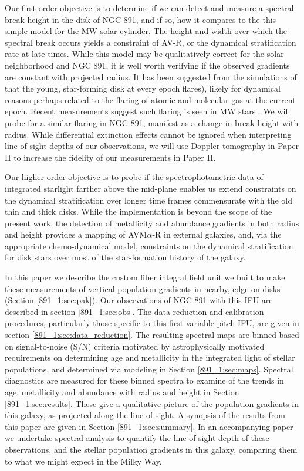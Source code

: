 Our first-order objective is to determine if we can detect and measure
a spectral break height in the disk of NGC 891, and if so, how it
compares to the this simple model for the MW solar cylinder. The
height and width over which the spectral break occurs yields a
constraint of AV-R, or the dynamical stratification rate at late
times. While this model may be qualitatively correct for the solar
neighborhood and NGC 891, it is well worth verifying if the observed
gradients are constant with projected radius.  It has been suggested
from the simulations of \citet{Martig14a} that the young, star-forming
disk at every epoch flares), likely for dynamical reasons perhaps
related to the flaring of atomic and molecular gas at the current
epoch. Recent measurements suggest such flaring is seen in MW stars
\citep{Ness16}. We will probe for a similar flaring in NGC 891,
manifest as a change in break height with radius.  While differential
extinction effects cannot be ignored when interpreting line-of-sight
depths of our observations, we will use Doppler tomography in Paper II
\citep[see for example,][]{Kregel05} to increase the fidelity of
our measurements in Paper II.

Our higher-order objective is to probe if the spectrophotometric data
of integrated starlight farther above the mid-plane enables us extend
constraints on the dynamical stratification over longer time frames
commensurate with the old thin and thick disks.  While the
implementation is beyond the scope of the present work, the detection
of metallicity and abundance gradients in both radius and height
provides a mapping of AVM$\alpha$-R in external galaxies, and, via the
appropriate chemo-dynamical model, constraints on the dynamical
stratification for disk stars over most of the star-formation history
of the galaxy.

In this paper we describe the custom fiber integral field unit we
built to make these measurements of vertical population gradients in
nearby, edge-on disks (Section \ref{891_1:sec:pak}).  Our observations of
NGC 891 with this IFU are described in section \ref{891_1:sec:obs}.  The
data reduction and calibration procedures, particularly those specific
to this first variable-pitch IFU, are given in section
\ref{891_1:sec:data_reduction}. The resulting spectral maps are binned based
on signal-to-noise (S/N) criteria motivated by astrophysically
motivated requirements on determining age and metallicity in the
integrated light of stellar populations, and determined via modeling
in Section \ref{891_1:sec:maps}. Spectral diagnostics are measured for these
binned spectra to examine of the trends in age, metallicity and
abundance with radius and height in Section \ref{891_1:sec:results}.  These
give a qualitative picture of the population gradients in this galaxy,
as projected along the line of sight. A synopsis of the results from
this paper are given in Section \ref{891_1:sec:summary}.  In an accompanying
paper we undertake spectral analysis to quantify the line of sight
depth of these observations, and the stellar population gradients in
this galaxy, comparing them to what we might expect in the Milky Way.

